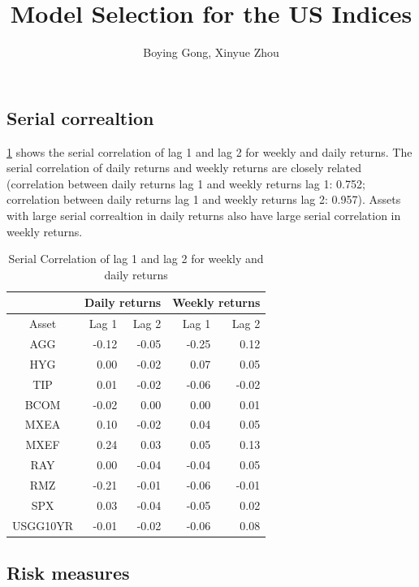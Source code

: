 \documentclass[12pt]{article}
\title{Model Selection for the US Indices}
\author{Boying Gong, Xinyue Zhou}
\begin{document}
\maketitle

\fi

\subsection{Serial correaltion}

\ref{table:serialCorRegime} shows the serial correlation of lag 1 and lag 2 for weekly and daily returns. The serial correlation of daily returns and weekly returns are closely related (correlation between daily returns lag 1 and weekly returns lag 1: 0.752; correlation between daily returns lag 1 and weekly returns lag 2: 0.957). Assets with large serial correaltion in daily returns also have large serial correlation in weekly returns.

\begin{table}[!h]
\caption{Serial Correlation of lag 1 and lag 2 for weekly and daily returns} 
\centering 
\begin{tabular}{ | c || r| r | r | r |} 
 \hline
  & \multicolumn{2}{c|}{Daily returns} & \multicolumn{2}{c|}{Weekly returns} \\ 
  \hline
Asset & Lag 1 & Lag 2 & Lag 1 & Lag 2 \\
  \hline \hline
AGG & -0.12 & -0.05 & -0.25 &  0.12\\ 
HYG &  0.00 & -0.02 &  0.07 &  0.05\\ 
TIP &  0.01 & -0.02 & -0.06 & -0.02\\ 
BCOM & -0.02 &  0.00 &  0.00 &  0.01\\ 
MXEA &  0.10 & -0.02 &  0.04 &  0.05\\ 
MXEF &  0.24 &  0.03 &  0.05 &  0.13\\ 
RAY &  0.00 & -0.04 & -0.04 &  0.05\\ 
RMZ & -0.21 & -0.01 & -0.06 & -0.01\\ 
SPX &  0.03 & -0.04 & -0.05 &  0.02\\ 
USGG10YR & -0.01 & -0.02 & -0.06 &  0.08 \\
 \hline
\end{tabular}
\label{table:serialCorRegime}
\end{table}


\subsection{Risk measures}
\end{document}
